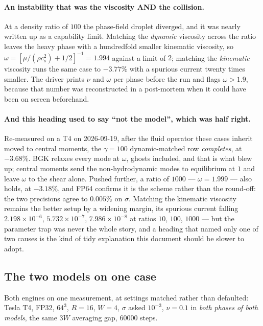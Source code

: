 \documentclass[11pt,a4paper]{article}
\newcommand{\cs}{c_s}
\begin{document}
\paragraph{An instability that was the viscosity AND the collision.} At a density
ratio of $100$ the phase-field droplet diverged, and it was nearly written up as
a capability limit. Matching the \emph{dynamic} viscosity across the ratio leaves
the heavy phase with a hundredfold smaller kinematic viscosity, so
$\omega = [\mu/(\rho\cs^2) + 1/2]^{-1} = 1.994$ against a limit of $2$; matching
the \emph{kinematic} viscosity runs the same case to $-3.77\%$ with a spurious
current twenty times smaller. The driver prints $\nu$ and $\omega$ per phase
before the run and flags $\omega > 1.9$, because that number was reconstructed in
a post-mortem when it could have been on screen beforehand.

\paragraph{And this heading used to say ``not the model'', which was half right.}
Re-measured on a T4 on 2026-09-19, after the fluid operator these cases inherit
moved to central moments, the $\gamma = 100$ dynamic-matched row \emph{completes},
at $-3.68\%$. BGK relaxes every mode at $\omega$, ghosts included, and that is
what blew up; central moments send the non-hydrodynamic modes to equilibrium at
$1$ and leave $\omega$ to the shear alone. Pushed further, a ratio of $1000$ ---
$\omega = 1.999$ --- also holds, at $-3.18\%$, and FP64 confirms it is the scheme
rather than the round-off: the two precisions agree to $0.005\%$ on $\sigma$.
Matching the kinematic viscosity remains the better setup by a widening margin,
its spurious current falling $2.198\times10^{-6}$, $5.732\times10^{-7}$,
$7.986\times10^{-8}$ at ratios $10$, $100$, $1000$ --- but the parameter trap was
never the whole story, and a heading that named only one of two causes is the kind
of tidy explanation this document should be slower to adopt.

\subsection{The two models on one case}
\label{sec:cgvspf}

Both engines on one measurement, at settings matched rather than defaulted:
Tesla T4, FP32, $64^3$, $R = 16$, $W = 4$, $\sigma$ asked $10^{-3}$,
$\nu = 0.1$ in \emph{both phases of both models}, the same $3W$ averaging gap,
60000 steps.
\end{document}
